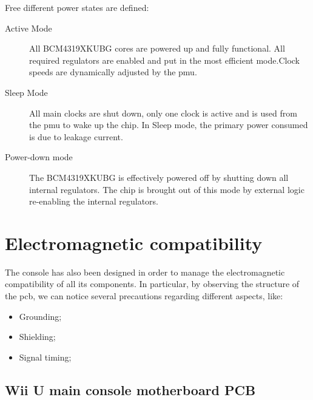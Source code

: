 \documentclass[11pt,a4paper,titlepage]{article}
\begin{document}
			Free different power states are defined:
			\begin{description}
				\item [Active Mode] All BCM4319XKUBG cores are powered up and fully functional. All required regulators are enabled and put in the most efficient mode.Clock speeds are dynamically adjusted by the \gls{pmu}.
				\item [Sleep Mode] All main clocks are shut down, only one clock is active and is used from the \gls{pmu} to wake up the chip. In Sleep mode, the primary power consumed is due to leakage current.
				\item	[Power-down mode] The BCM4319XKUBG is effectively powered off by shutting down all internal regulators. The chip is brought out of this mode by external logic re-enabling the internal regulators.

			\end{description}

\section{Electromagnetic compatibility}
  The console has also been designed in order to manage the electromagnetic compatibility of all its components. In particular, by observing the structure of the \gls{pcb}, we can notice several precautions regarding different aspects, like:
  \begin{itemize}
		\item Grounding;
		\item Shielding;
		\item Signal timing;
  \end{itemize}

  \subsection{Wii U main console motherboard PCB}
\end{document}

